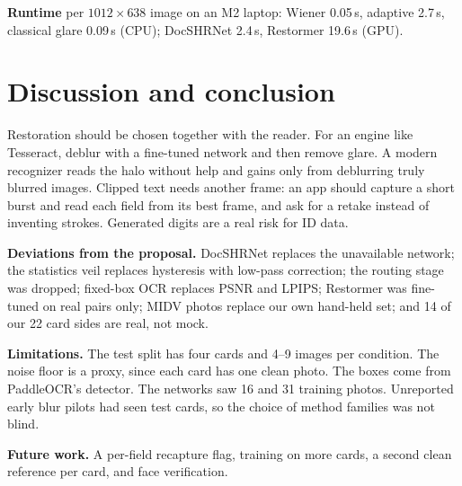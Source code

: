 \documentclass{article}
\begin{document}
\textbf{Runtime} per $1012\times638$ image on an M2 laptop: Wiener 0.05\,s, adaptive 2.7\,s, classical glare 0.09\,s (CPU); DocSHRNet 2.4\,s, Restormer 19.6\,s (GPU).

\section{Discussion and conclusion}
\label{sec:conclusion}
Restoration should be chosen together with the reader. For an engine like Tesseract, deblur with a fine-tuned network and then remove glare. A modern recognizer reads the halo without help and gains only from deblurring truly blurred images. Clipped text needs another frame: an app should capture a short burst and read each field from its best frame, and ask for a retake instead of inventing strokes. Generated digits are a real risk for ID data.

\textbf{Deviations from the proposal.} DocSHRNet replaces the unavailable network; the statistics veil replaces hysteresis with low-pass correction; the routing stage was dropped; fixed-box OCR replaces PSNR and LPIPS; Restormer was fine-tuned on real pairs only; MIDV photos replace our own hand-held set; and 14 of our 22 card sides are real, not mock.

\textbf{Limitations.} The test split has four cards and 4--9 images per condition. The noise floor is a proxy, since each card has one clean photo. The boxes come from PaddleOCR's detector. The networks saw 16 and 31 training photos. Unreported early blur pilots had seen test cards, so the choice of method families was not blind.

\textbf{Future work.} A per-field recapture flag, training on more cards, a second clean reference per card, and face verification.

\let\oldthebibliography\thebibliography
\renewcommand{\thebibliography}[1]{\oldthebibliography{#1}\setlength{\itemsep}{1pt}\setlength{\parsep}{0pt}}


\end{document}
